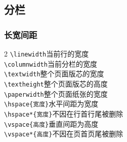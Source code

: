 \subsection{分栏}
\cprotEnv\begin{frame}
	\frametitle{长宽间距}
	\scriptsize
	\begin{multicols}{2}
		\verb|\linewidth|\hfill 当前行的宽度\\
		\verb|\columnwidth|\hfill 当前分栏的宽度\\
		\verb|\textwidth|\hfill 整个页面版芯的宽度\\
		\verb|\textheight|\hfill 整个页面版芯的高度\\
		\verb|\paperwidth|\hfill 整个页面纸张的宽度\\
		\verb|\hspace{宽度}|\hfill 水平间距为宽度\\
		\verb|\hspace*{宽度}|\hfill 不因在行首行尾被删除\\
		\verb|\vspace{高度}|\hfill 垂直间距为高度\\
		\verb|\vspace*{高度}|\hfill 不因在页首页尾被删除\\
	\end{multicols}
\end{frame}

